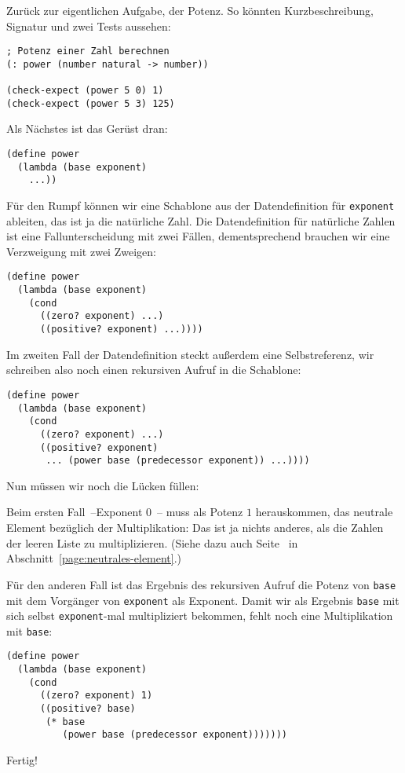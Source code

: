 Zurück zur eigentlichen Aufgabe, der Potenz.  So könnten
Kurzbeschreibung, Signatur und zwei Tests aussehen:
%
\begin{lstlisting}
; Potenz einer Zahl berechnen
(: power (number natural -> number))

(check-expect (power 5 0) 1)
(check-expect (power 5 3) 125)
\end{lstlisting}
%
Als Nächstes ist das Gerüst dran:
%
\begin{lstlisting}
(define power
  (lambda (base exponent)
    ...))
\end{lstlisting}
%
Für den Rumpf können wir eine Schablone aus der Datendefinition
für \lstinline{exponent} ableiten, das ist ja die natürliche
Zahl.  Die Datendefinition für natürliche Zahlen ist eine
Fallunterscheidung mit zwei Fällen, dementsprechend brauchen wir eine
Verzweigung mit zwei Zweigen:
%
\begin{lstlisting}
(define power
  (lambda (base exponent)
    (cond
      ((zero? exponent) ...)
      ((positive? exponent) ...))))
\end{lstlisting}
%
Im zweiten Fall der Datendefinition steckt außerdem eine
Selbstreferenz, wir schreiben also noch einen rekursiven Aufruf in die
Schablone:
%
\begin{lstlisting}
(define power
  (lambda (base exponent)
    (cond
      ((zero? exponent) ...)
      ((positive? exponent)
       ... (power base (predecessor exponent)) ...))))
\end{lstlisting}
%
Nun müssen wir noch die Lücken füllen:

Beim ersten Fall~--Exponent $0$~-- muss als Potenz $1$ herauskommen, das
neutrale Element bezüglich der Multiplikation: Das ist ja nichts
anderes, als die Zahlen der leeren Liste zu multiplizieren.  (Siehe
dazu auch Seite~\pageref{page:neutrales-element} in
Abschnitt~\ref{page:neutrales-element}.)

Für den anderen Fall ist das Ergebnis des rekursiven Aufruf die Potenz
von \lstinline{base} mit dem Vorgänger von \lstinline{exponent} als
Exponent.  Damit wir als Ergebnis \lstinline{base} mit sich selbst
\lstinline{exponent}-mal multipliziert bekommen, fehlt noch eine
Multiplikation mit \lstinline{base}:
%
\begin{lstlisting}
(define power
  (lambda (base exponent)
    (cond
      ((zero? exponent) 1)
      ((positive? base)
       (* base
          (power base (predecessor exponent)))))))
\end{lstlisting}
%
Fertig!

